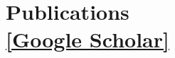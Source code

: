 
\section{\sc Publications\\\href{https://scholar.google.com/citations?user=l996-A8AAAAJ\&hl=en}{[Google Scholar]}}

\hfill
\vspace{-\baselineskip}
\nocite{*}


